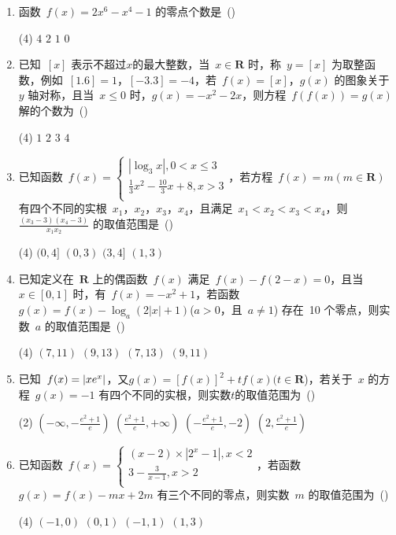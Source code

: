 \documentclass[UTF8,twoside,openright]{ctexbook}
\newcommand{\hfquan}[1]{\raisebox{-0.05em}{\koz\CIDtextblackboxed{#1}}}
\newenvironment{zuoye}{
\begin{enumerate}
[
labelindent=0mm,
align=left,
labelwidth=1.5em,
itemsep=2em,
labelsep=0em,
leftmargin=1.5em,
label={\textcolor{cyan}{\hfquan{\arabic*}}}]
}
{\end{enumerate}}
\begin{document}
\begin{zuoye}
\item 函数~$f(x)=2x^{6}-x^{4}-1$ 的零点个数是~(\quad)
\begin{tasks}(4)
    \task $4$ \task $2$
    \task $1$ \task $0$
\end{tasks}

\item 已知~$[x]$ 表示不超过$x$的最大整数，当~$x\in
\mathbf{R}$ 时，称~$y=[x]$ 为取整函数，例如~$[1.6]=1$，$[-3.3]=-4$，若~$f(x)=[x]$，$g(x)$ 的图象关于~$y$ 轴对称，且当~$x\leq
0$ 时，$g(x)=-x^{2}-2x$，则方程~$f(f(x))=g(x)$ 解的个数为~(\quad)
\begin{tasks}(4)
    \task $1 $ \task $2$
    \task $3$ \task $4$
\end{tasks}

\item 已知函数~$f(x)=
\begin{cases}
 {|\log_{3} x|,0<x\leq 3} \\
 {\frac{1}{3}x^{2}-\frac{10}{3}x+8,x>3} \\
\end{cases}
$，若方程~$f(x)=m(m\in
\textbf{R})$ 有四个不同的实根~$x_{1} $，$x_{2} $，$x_{3} $，$x_{4}
$，且满足~$x_{1} <x_{2} <x_{3} <x_{4} $，则~$\frac{(x_{3} -3)(x_{4} -3)}{x_{1}
x_{2} }$ 的取值范围是~(\quad)
\begin{tasks}(4)
    \task $(0,4]$ \task $(0,3) $
    \task $ (3,4]$ \task $(1,3) $
\end{tasks}

\item 已知定义在~$\mathbf{R}$ 上的偶函数~$f(x)$ 满足~$f(x)-f(2-x)=0$，且当~$x\in
[0,1]$ 时，有~$f(x)=-x^{2}+1$，若函数~$g(x)=f(x)-\log_{a}
(2|x|+1)$($a>0$，且~$a\ne 1$) 存在~10 个零点，则实数~$a$ 的取值范围是~(\quad)
\begin{tasks}(4)
    \task $(7,11)$ \task $(9,13)$
    \task $(7,13)$ \task $(9,11)$
\end{tasks}

\item 已知~$f(x)=|xe^{x}{\rm |}$，又$g(x)=[f(x)]^{2}+tf(x)(t\in
\textbf{R}$)，若关于~$x$ 的方程~$g(x)=-1$ 有四个不同的实根，则实数$t$的取值范围为~(\quad)
\begin{tasks}(2)
    \task $(-\infty,-\frac{e^{2}+1}{e}) $
    \task $(\frac{e^{2}+1}{e},+\infty) $
    \task $ (-\frac{e^{2}+1}{e},-2)$
    \task $(2,\frac{e^{2}+1}{e})$
\end{tasks}

\item 已知函数~$f(x)=
\begin{cases}
{(x-2)\times |2^{x}-1|,x<2} \\
 {3-\frac{3}{x-1},x>2} \\
\end{cases}
 $，若函数~$g(x)=f(x)-mx+2m$ 有三个不同的零点，则实数~$m$ 的取值范围为~(\quad)
 \begin{tasks}(4)
    \task $ (-1,0)$ \task $(0,1)$
    \task $(-1,1)$ \task $(1,3)$
\end{tasks}


\end{zuoye}
\end{document}
